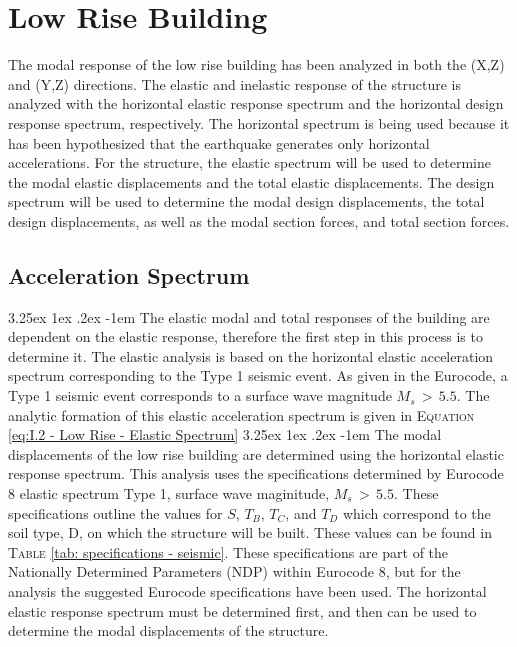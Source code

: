 \documentclass[11pt,a4paper,titlepage]{report}
\makeatletter
\renewcommand\paragraph{\@startsection{paragraph}{5}{\z@}%
  {3.25ex \@plus1ex \@minus.2ex}%
  {-1em}%
  {\normalfont\normalsize\bfseries}}
\makeatother
\begin{document}
\section{Low Rise Building}
The modal response of the low rise building has been analyzed in both the (X,Z) and (Y,Z) directions. The elastic and inelastic response of the structure is analyzed with the horizontal elastic response spectrum and the horizontal design response spectrum, respectively. The horizontal spectrum is being used because it has been hypothesized that the earthquake generates only horizontal accelerations. For the structure, the elastic spectrum will be used to determine the modal elastic displacements and the total elastic displacements. The design spectrum will be used to determine the modal design displacements, the total design displacements, as well as the modal section forces, and total section forces. 
\subsection{Acceleration Spectrum}\label{sec: Elastic Modal Displacmenets}
\paragraph{} The elastic modal and total responses of the building are dependent on the elastic response, therefore the first step in this process is to determine it. The elastic analysis is based on the horizontal elastic acceleration spectrum corresponding to the Type 1 seismic event. As given in the Eurocode, a Type 1 seismic event corresponds to a surface wave magnitude $M_s\,>\,5.5$. The analytic formation of this elastic acceleration spectrum is given in \textsc{Equation}\,\eqref{eq:I.2 - Low Rise - Elastic Spectrum} 
\paragraph{}The modal displacements of the low rise building are determined using the horizontal elastic response spectrum. This analysis uses the specifications determined by Eurocode 8 elastic spectrum Type 1, surface wave maginitude, $M_s\,>\,5.5$. These specifications outline the values for $S$, $T_B$, $T_C$, and $T_D$ which correspond to the soil type, D, on which the structure will be built. These values can be found in \textsc{Table} \ref{tab: specifications - seismic}. These specifications are part of the Nationally Determined Parameters (NDP) within Eurocode 8, but for the analysis the suggested Eurocode specifications have been used. The horizontal elastic response spectrum must be determined first, and then can be used to determine the modal displacements of the structure.
\end{document}
